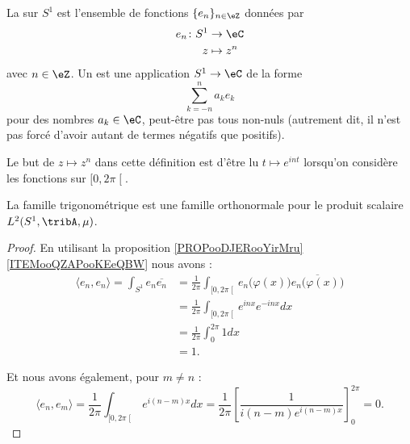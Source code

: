 \begin{definition}
	La  sur \( S^1\) est l'ensemble de fonctions \( \{ e_n \}_{n\in \eZ}\) données par
	\begin{equation}
		\begin{aligned}
			e_n\colon S^1 & \to \eC     \\
			z             & \mapsto z^n
		\end{aligned}
	\end{equation}
	avec \( n\in \eZ\). Un  est une application \( S^1\to \eC\) de la forme
	\begin{equation}
		\sum_{k=-n}^na_ke_k
	\end{equation}
	pour des nombres \( a_k\in \eC\), peut-être pas tous non-nuls (autrement dit, il n'est pas forcé d'avoir autant de termes négatifs que positifs).
\end{definition}
Le but de \( z\mapsto z^n\) dans cette définition est d'être lu \(  t\mapsto e^{in t}\) lorsqu'on considère les fonctions sur \( \mathopen[ 0 , 2\pi \mathclose[\).

\begin{proposition}     \label{PROPooOMGFooROFFFr}
	La famille trigonométrique est une famille orthonormale pour le produit scalaire \( L^2(S^1,\tribA,\mu)\).
\end{proposition}

\begin{proof}
	En utilisant la proposition \ref{PROPooDJERooYirMru}\ref{ITEMooQZAPooKEeQBW} nous avons :
	\begin{subequations}
		\begin{align}
			\langle e_n, e_n\rangle =\int_{S^1}e_n\overline{ e_n } & =\frac{1}{ 2\pi }\int_{\mathopen\lbrack 0 , 2\pi \mathclose\lbrack}e_n\big( \varphi(x) \big)\overline{ e_n\big( \varphi(x) \big) } \\
			                                                       & =\frac{1}{ 2\pi }\int_{\mathopen\lbrack 0 , 2\pi \mathclose\lbrack} e^{inx} e^{-inx}dx                                             \\
			                                                       & =\frac{1}{ 2\pi }\int_{0}^{2\pi}1dx                                                                                                \\
			                                                       & =1.
		\end{align}
	\end{subequations}

	Et nous avons également, pour \( m\neq n\) :
	\begin{equation}
		\langle e_n, e_m\rangle =\frac{1}{ 2\pi }\int_{\mathopen[ 0 , 2\pi \mathclose[} e^{i(n-m)x}dx=\frac{1}{ 2\pi }\left[ \frac{1}{ i(n-m) e^{i(n-m)x} } \right]_0^{2\pi}=0.
	\end{equation}
\end{proof}

